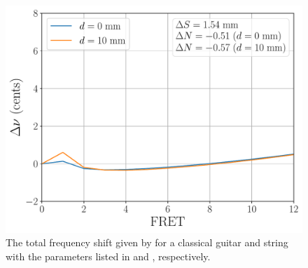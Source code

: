 
\begin{figure}
  \centering
  \includegraphics[width=5.0in]{figures/comp_est}
  \caption{\label{fig:comp_est} The total frequency shift given by  for a classical guitar and string with the parameters listed in  and , respectively.}
\end{figure}


